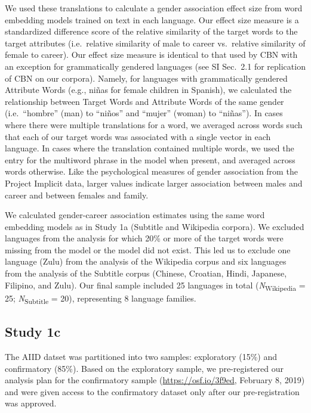 \documentclass[9pt,twocolumn]{pnas-new}
\begin{document}
We used these translations to calculate a gender association effect size from
word embedding models trained on text in each language. Our effect size
measure is a standardized difference score of the relative similarity of
the target words to the target attributes (i.e.~relative similarity of
male to career vs.~relative similarity of female to career). Our effect
size measure is identical to that used by CBN with an exception for
grammatically gendered languages (see SI Sec.\ 2.1 for replication of CBN on our
corpora). Namely, for languages with grammatically gendered Attribute
Words (e.g., niñas for female children in Spanish), we calculated the
relationship between Target Words and Attribute Words of the same gender
(i.e.~\enquote{hombre} (man) to \enquote{niños} and \enquote{mujer}
(woman) to \enquote{niñas}). In cases where there were multiple
translations for a word, we averaged across words such that each of our
target words was associated with a single vector in each language. In
cases where the translation contained multiple words, we used the entry
for the multiword phrase in the model when present, and averaged across
words otherwise. Like the psychological measures of gender association from the
Project Implicit data, larger values indicate larger association between males and career and between females and family.

We calculated gender-career association estimates using the same word embedding models
as in Study 1a (Subtitle and Wikipedia corpora). We excluded languages
from the analysis for which 20\% or more of the target words were
missing from the model or the model did not exist. This led us to
exclude one language (Zulu) from the analysis of the Wikipedia corpus
and six languages from the analysis of the Subtitle corpus (Chinese,
Croatian, Hindi, Japanese, Filipino, and Zulu). Our final sample
included 25 languages in total (\emph{N}\textsubscript{Wikipedia} = 25;
\emph{N}\textsubscript{Subtitle} = 20), representing 8 language
families. 


\subsection*{Study 1c}

The AIID datset was partitioned into two samples: exploratory (15\%) and
confirmatory (85\%). Based on the exploratory sample, we pre-registered
our analysis plan for the confirmatory sample
(\url{https://osf.io/3f9ed}, February 8, 2019) and were given access to the confirmatory dataset only after our pre-registration was approved. 
\end{document}
